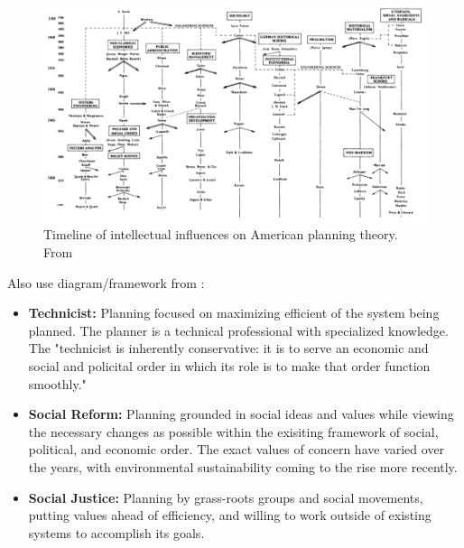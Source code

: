 \clearpage
\begin{figure}
	\centering
	\includegraphics[scale=0.65]{Figures/chap2/friedman_timeline.png}
	\caption[Timeline of intellectual influences on American planning theory]{Timeline of intellectual influences on American planning theory. From \cite{mazza2017}}
	\label{fig:friedman_timeline}
\end{figure}
\clearpage

Also use diagram/framework from \cite{marcuseThreeHistoricCurrents2016}:

\begin{itemize}
    \setlength{\itemsep}{0pt}%
    \setlength{\parskip}{0pt}%
	\item{\textbf{Technicist:} Planning focused on maximizing efficient of the system being planned. The planner is a technical professional with specialized knowledge. The "technicist is inherently conservative: it is to serve an economic and social and policital order in which its role is to make that order function smoothly."}
	\item{\textbf{Social Reform:} Planning grounded in social ideas and values while viewing the necessary changes as possible within the exisiting framework of social, political, and economic order. The exact values of concern have varied over the years, with environmental sustainability coming to the rise more recently.}
	\item{\textbf{Social Justice:} Planning by grass-roots groups and social movements, putting values ahead of efficiency, and willing to work outside of existing systems to accomplish its goals.}
\end{itemize}


